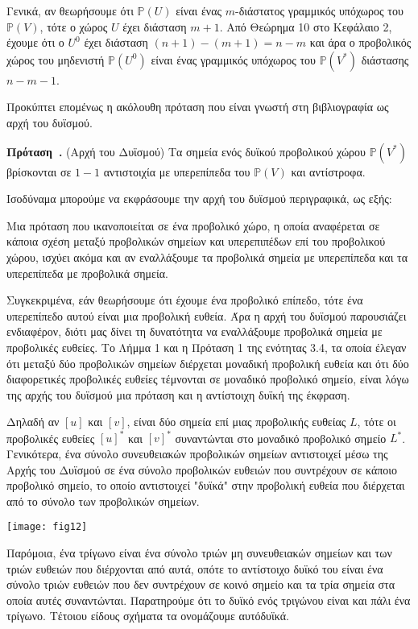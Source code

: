 \documentclass[12pt, a4paper]{book}
\newcounter{sentence}[section]
\newenvironment{sentence}[1][]{\refstepcounter{sentence}\par\medskip
   \textbf{Πρόταση~\thesentence. #1} \rmfamily}{\medskip}
\begin{document}
Γενικά, αν θεωρήσουμε ότι $\mathbb{P}(U)$ είναι ένας $m$-διάστατος γραμμικός υπόχωρος του $\mathbb{P}(V)$, τότε ο χώρος $U$ έχει διάσταση $m+1$. Από Θεώρημα 10 στο Κεφάλαιο 2, έχουμε ότι ο $U^0$ έχει διάσταση $(n+1)-(m+1) =n-m$ και άρα ο προβολικός χώρος του μηδενιστή $\mathbb{P}(U^0)$ είναι ένας γραμμικός υπόχωρος του $\mathbb{P}(V^*)$ διάστασης $n-m-1$. 

Προκύπτει επομένως η ακόλουθη πρόταση που είναι γνωστή  στη βιβλιογραφία ως αρχή του δυϊσμού.

\begin{sentence}
(Αρχή του Δυϊσμού) Τα σημεία ενός δυϊκού προβολικού χώρου $\mathbb{P}(V^*)$ βρίσκονται σε $1-1$ αντιστοιχία με υπερεπίπεδα του $\mathbb{P}(V)$ και αντίστροφα.
\end{sentence}

Ισοδύναμα μπορούμε να εκφράσουμε την αρχή του δυϊσμού περιγραφικά, ως εξής:

Μια πρόταση που ικανοποιείται σε ένα προβολικό χώρο, η οποία αναφέρεται σε κάποια σχέση μεταξύ προβολικών σημείων και υπερεπιπέδων επί του προβολικού χώρου, ισχύει ακόμα και αν εναλλάξουμε τα προβολικά σημεία με υπερεπίπεδα και τα υπερεπίπεδα με προβολικά σημεία.

Συγκεκριμένα, εάν θεωρήσουμε ότι έχουμε ένα προβολικό επίπεδο, τότε ένα υπερεπίπεδο αυτού είναι μια προβολική ευθεία. Άρα η αρχή του δυϊσμού παρουσιάζει ενδιαφέρον, διότι μας δίνει τη δυνατότητα να εναλλάξουμε προβολικά σημεία με προβολικές ευθείες. Το Λήμμα 1 και η Πρόταση 1 της ενότητας  3.4, τα οποία έλεγαν ότι μεταξύ δύο προβολικών σημείων διέρχεται μοναδική προβολική ευθεία και ότι δύο διαφορετικές προβολικές ευθείες τέμνονται σε μοναδικό προβολικό σημείο, είναι λόγω της αρχής του δυϊσμού μια πρόταση και η αντίστοιχη δυϊκή της έκφραση. 

Δηλαδή αν $[u]$ και  $[v]$, είναι δύο σημεία επί μιας προβολικής ευθείας $L$, τότε οι προβολικές ευθείες $[u]^*$ και $[v]^*$ συναντώνται στο μοναδικό προβολικό σημείο $L^*$.  Γενικότερα, ένα σύνολο συνευθειακών προβολικών σημείων αντιστοιχεί μέσω της Αρχής του Δυϊσμού σε ένα σύνολο προβολικών ευθειών που συντρέχουν σε κάποιο προβολικό σημείο, το οποίο αντιστοιχεί "δυϊκά" στην προβολική ευθεία που διέρχεται από το σύνολο των προβολικών σημείων. 

\begin{center}
\texttt{[image: fig12]}
\end{center}

Παρόμοια, ένα τρίγωνο είναι ένα σύνολο τριών μη συνευθειακών σημείων και των τριών ευθειών που διέρχονται από αυτά, οπότε το αντίστοιχο δυϊκό του είναι ένα σύνολο τριών ευθειών που δεν συντρέχουν σε κοινό σημείο και τα τρία σημεία στα οποία αυτές συναντώνται. Παρατηρούμε ότι το δυϊκό ενός τριγώνου είναι και πάλι ένα τρίγωνο. Τέτοιου είδους σχήματα τα ονομάζουμε αυτόδυϊκά.
\end{document}
